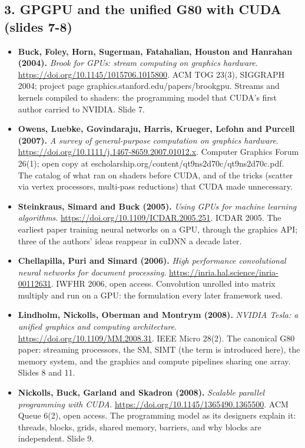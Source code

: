 \subsection*{3. GPGPU and the unified G80 with CUDA (slides 7-8)}
\begin{itemize}[leftmargin=1.2em,itemsep=3pt]\sloppy
\item \textbf{Buck, Foley, Horn, Sugerman, Fatahalian, Houston and Hanrahan (2004).} \textit{Brook for GPUs: stream computing on graphics hardware}. \url{https://doi.org/10.1145/1015706.1015800}. ACM TOG 23(3), SIGGRAPH 2004; project page graphics.stanford.edu/papers/brookgpu. Streams and kernels compiled to shaders: the programming model that CUDA's first author carried to NVIDIA. Slide 7.
\item \textbf{Owens, Luebke, Govindaraju, Harris, Krueger, Lefohn and Purcell (2007).} \textit{A survey of general-purpose computation on graphics hardware}. \url{https://doi.org/10.1111/j.1467-8659.2007.01012.x}. Computer Graphics Forum 26(1); open copy at escholarship.org/content/qt9ns2d70c/qt9ns2d70c.pdf. The catalog of what ran on shaders before CUDA, and of the tricks (scatter via vertex processors, multi-pass reductions) that CUDA made unnecessary.
\item \textbf{Steinkraus, Simard and Buck (2005).} \textit{Using GPUs for machine learning algorithms}. \url{https://doi.org/10.1109/ICDAR.2005.251}. ICDAR 2005. The earliest paper training neural networks on a GPU, through the graphics API; three of the authors' ideas reappear in cuDNN a decade later.
\item \textbf{Chellapilla, Puri and Simard (2006).} \textit{High performance convolutional neural networks for document processing}. \url{https://inria.hal.science/inria-00112631}. IWFHR 2006, open access. Convolution unrolled into matrix multiply and run on a GPU: the formulation every later framework used.
\item \textbf{Lindholm, Nickolls, Oberman and Montrym (2008).} \textit{NVIDIA Tesla: a unified graphics and computing architecture}. \url{https://doi.org/10.1109/MM.2008.31}. IEEE Micro 28(2). The canonical G80 paper: streaming processors, the SM, SIMT (the term is introduced here), the memory system, and the graphics and compute pipelines sharing one array. Slides 8 and 11.
\item \textbf{Nickolls, Buck, Garland and Skadron (2008).} \textit{Scalable parallel programming with CUDA}. \url{https://doi.org/10.1145/1365490.1365500}. ACM Queue 6(2), open access. The programming model as its designers explain it: threads, blocks, grids, shared memory, barriers, and why blocks are independent. Slide 9.

\end{itemize}

